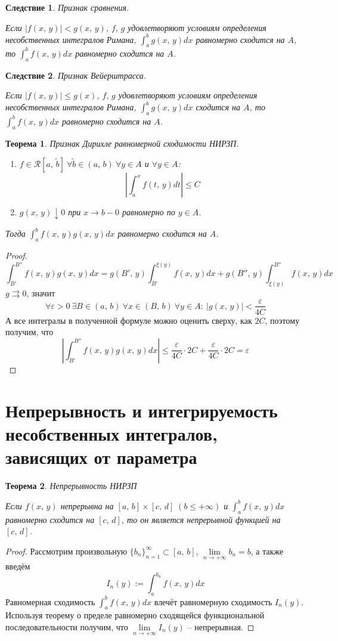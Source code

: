 \documentclass[a4paper,12pt]{article}
\renewcommand{\leq}{\ensuremath{\leqslant}}
\theoremstyle{plain}
\newtheorem{theorem}{Теорема}[section]
\newtheorem*{corollary}{Следствие}
\theoremstyle{definition}
\theoremstyle{remark}
\begin{document}
\begin{corollary}
	Признак сравнения.

	Если $|f(x,\,y)| < g(x,\,y)$, $f,\,g$ удовлетворяют условиям определения несобственных интегралов Римана, $\int_a^b g(x,\,y)dx$ равномерно сходится на $A$, то $\int_a^b f(x,\,y)dx$ равномерно сходится на $A$.
\end{corollary}

\begin{corollary}
	Признак Вейерштрасса.

	Если $|f(x,\,y)| \leq g(x)$, $f,\,g$ удовлетворяют условиям определения несобственных интегралов Римана, $\int_a^b g(x,\,y)dx$ сходится на $A$, то $\int_a^b f(x,\,y)dx$ равномерно сходится на $A$.
\end{corollary}

\begin{theorem}
	Признак Дирихле равномерной сходимости НИРЗП.

	\begin{enumerate}
		\item $f \in \mathcal{R}[a,\,\tilde{b}]\:\forall \tilde{b} \in (a,\,b) \: \forall y \in A$ и $\forall y \in A$:
		\[\left|\int_a^x f(t,\,y)dt\right| \leq C\]
		\item $g(x,\,y) \downarrow 0$ при $x \to b - 0$ равномерно по $y \in A$.
	\end{enumerate}
	Тогда $\int_a^b f(x,\,y)g(x,\,y)dx$ равномерно сходится на $A$.
\end{theorem}
\begin{proof}
	\[\int_{B'}^{B''}f(x,\,y)g(x,\,y)dx = g(B',\,y)\int_{B'}^{\xi(y)}f(x,\,y)dx + g(B'',\,y)\int_{\xi(y)}^{B''}f(x,\,y)dx\]
	$g \rightrightarrows 0$, значит
	\[\forall \varepsilon > 0 \: \exists B \in (a,\,b) \: \forall x \in (B,\,b) \: \forall y \in A :\: |g(x,\,y)| < \frac{\varepsilon}{4C}\]
	А все интегралы в полученной формуле можно оценить сверху, как $2C$, поэтому получим, что 
	\[\left|\int_{B'}^{B''}f(x,\,y)g(x,\,y)dx\right| \leq \frac{\varepsilon}{4C}\cdot 2C + \frac{\varepsilon}{4C}\cdot 2C = \varepsilon\]
\end{proof}

\section{Непрерывность и интегрируемость несобственных интегралов, зависящих от параметра}
\begin{theorem}
	Непрерывность НИРЗП

	Если $f(x,\,y)$ непрерывна на $[a,\,b] \times [c,\,d]\; (b \leq +\infty)$ и $\int_a^bf(x,\,y)dx$ равномерно сходится на $[c,\,d]$, то он является непрерывной функцией на $[c,\,d]$.
\end{theorem}
\begin{proof}
	Рассмотрим произвольную $\{b_n\}_{n = 1}^\infty \subset [a,\,b],\,\lim\limits_{n \to +\infty}b_n = b$, а также введём
	\[I_n(y) := \int_a^{b_n}f(x,\,y)dx\]
	Равномерная сходимость $\int_a^bf(x,\,y)dx$ влечёт равномерную сходимость $I_n(y)$. Используя теорему о пределе равномерно сходящейся функциональной последовательности получим, что $\lim\limits_{n \to +\infty} I_n(y)$ -- непрерывная.
\end{proof}
\end{document}
